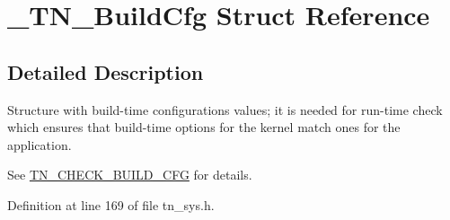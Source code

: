 \hypertarget{struct__TN__BuildCfg}{}\section{\+\_\+\+T\+N\+\_\+\+Build\+Cfg Struct Reference}
\label{struct__TN__BuildCfg}


\subsection{Detailed Description}
Structure with build-\/time configurations values; it is needed for run-\/time check which ensures that build-\/time options for the kernel match ones for the application. 

See {\ttfamily \hyperlink{tn__cfg__default_8h_aacdc913eb66492cf69cf02a5de73578e}{T\+N\+\_\+\+C\+H\+E\+C\+K\+\_\+\+B\+U\+I\+L\+D\+\_\+\+C\+FG}} for details. 

Definition at line 169 of file tn\+\_\+sys.\+h.

